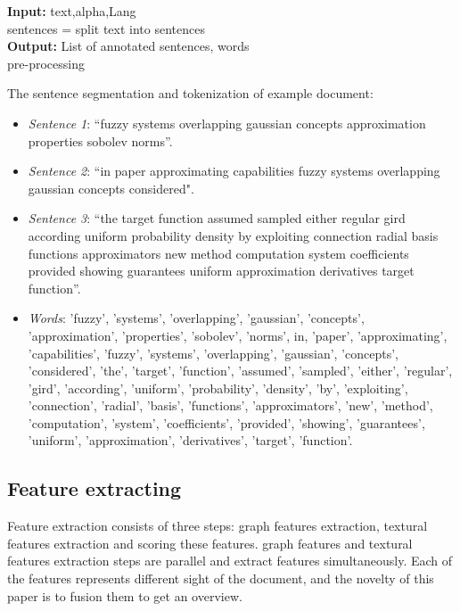 \documentclass[3p]{elsarticle}
\begin{document}
\begin{algorithm}
\SetAlgoLined

 \textbf{Input:} text,alpha,Lang \\
 sentences = split text into sentences\\
\textbf{Output:} List of annotated sentences, words\\

\caption{pre-processing}
\label{alg:pre-processing}
\end{algorithm}

\begin{tcolorbox}
    \small{
        The sentence segmentation and tokenization of example document:
        \begin{itemize}
            \item \textit{Sentence 1}: “fuzzy systems overlapping gaussian concepts approximation properties sobolev norms”.
            \item \textit{Sentence 2}: “in paper approximating capabilities fuzzy systems overlapping gaussian concepts considered".
            \item \textit{Sentence 3}: “the target function assumed sampled either regular gird according uniform probability density by exploiting connection radial basis functions approximators new method computation system coefficients provided showing guarantees uniform approximation derivatives target function”.
            \item \textit{Words}: 'fuzzy', 'systems', 'overlapping', 'gaussian', 'concepts', 'approximation', 'properties', 'sobolev', 'norms', in, 'paper', 'approximating', 'capabilities', 'fuzzy', 'systems', 'overlapping', 'gaussian', 'concepts', 'considered', 'the', 'target', 'function', 'assumed', 'sampled', 'either', 'regular', 'gird', 'according', 'uniform', 'probability', 'density', 'by', 'exploiting', 'connection', 'radial', 'basis', 'functions', 'approximators', 'new', 'method', 'computation', 'system', 'coefficients', 'provided', 'showing', 'guarantees', 'uniform', 'approximation', 'derivatives', 'target', 'function'.
        \end{itemize}
    }
\end{tcolorbox}
\subsection{Feature extracting}
Feature extraction consists of three steps: graph features extraction, textural features extraction and scoring these features. graph features and textural features extraction steps are parallel and extract features simultaneously. Each of the features represents different sight of the document, and the novelty of this paper is to fusion them to get an overview.
\end{document}
